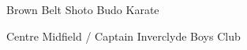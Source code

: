 


\begin{cventries}

  \cventry
    {Brown Belt} %
    {Shoto Budo Karate} %
    {} %
    {} %
    {
    }

  \cventry
    {Centre Midfield / Captain} %
    {Inverclyde Boys Club} %
    {} %
    {} %
    {
    }
\end{cventries}
